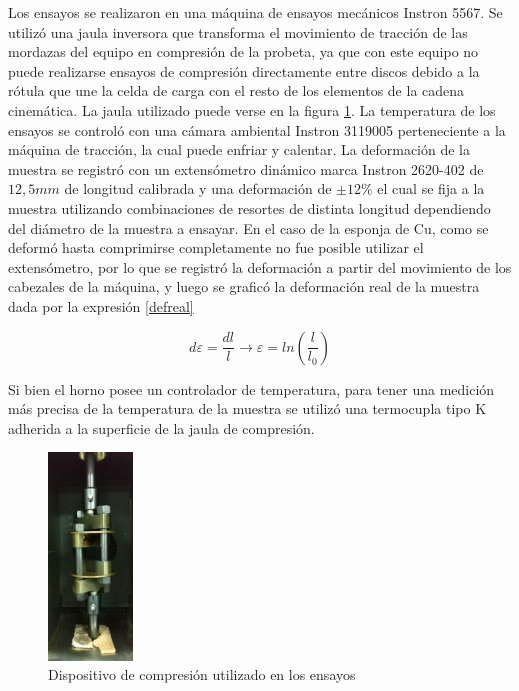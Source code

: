 \documentclass[a4paper,12pt,fleqn,twoside,openany]{book}
\begin{document}
Los ensayos se realizaron en una máquina de ensayos mecánicos Instron 5567. Se utilizó una jaula inversora que transforma el movimiento de tracción de las mordazas del equipo en compresión de la probeta, ya que con este equipo no puede realizarse ensayos de compresión directamente entre discos debido a la rótula que une la celda de carga con el resto de los elementos de la cadena cinemática. La jaula utilizado puede verse en la figura \ref{fig:jaula}. La 
temperatura de los ensayos se controló con una cámara ambiental Instron 3119005
perteneciente a la máquina de tracción, la cual puede enfriar y calentar.
La deformación de la muestra se registró con un extensómetro dinámico marca Instron 2620-402 de $12,5 mm$ de longitud calibrada y una deformación de $\pm 12\%$ el cual se fija a la muestra utilizando combinaciones de 
resortes de distinta longitud dependiendo del diámetro de la muestra a ensayar. En el caso de la esponja de Cu, como se deformó hasta comprimirse 
completamente no fue posible utilizar el extensómetro, por lo que se registró la deformación a partir del movimiento de los cabezales de la máquina, y luego 
se graficó la deformación real de la muestra dada por la expresión \ref{defreal}

\begin{equation}
d \varepsilon = \frac{dl}{l}  \longrightarrow  \varepsilon =ln \left(\frac{l}{l_0}\right) \label{defreal} 
\end{equation}



Si bien el horno posee un controlador de temperatura, para tener una medición
más precisa de la temperatura de la muestra se utilizó una termocupla tipo K adherida a la superficie de la jaula de compresión.

\begin{figure}
 \centering
 \includegraphics[width=0.2\textwidth]{Img/Procedimiento/jaula.jpg}
 \caption{Dispositivo de compresión utilizado en los ensayos} 
 \label{fig:jaula}
 \end{figure}
\end{document}
